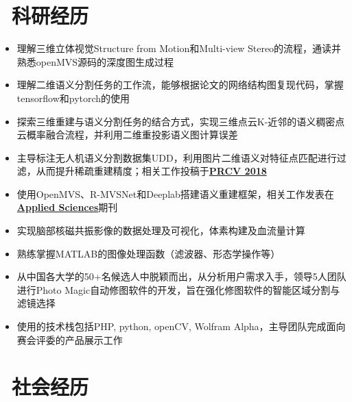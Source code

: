\documentclass{resume}
\begin{document}
\section{\faFlask\ 科研经历}

\begin{itemize}
    \item 理解三维立体视觉Structure from Motion和Multi-view Stereo的流程，通读并熟悉openMVS源码的深度图生成过程
    \item 理解二维语义分割任务的工作流，能够根据论文的网络结构图复现代码，掌握tensorflow和pytorch的使用
    \item 探索三维重建与语义分割任务的结合方式，实现三维点云K-近邻的语义稠密点云概率融合流程，并利用二维重投影语义图计算误差
	\item 主导标注无人机语义分割数据集UDD，利用图片二维语义对特征点匹配进行过滤，从而提升稀疏重建精度；相关工作投稿于\href{https://link.springer.com/content/pdf/10.1007\%2F978-3-030-03398-9_30.pdf}{\textbf{PRCV 2018}}
	\item 使用OpenMVS、R-MVSNet和Deeplab搭建语义重建框架，相关工作发表在\href{https://www.mdpi.com/2076-3417/10/4/1275/pdf}{\textbf{Applied Sciences}}期刊
\end{itemize}

\begin{itemize}[parsep=0.5ex]
  \item 实现脑部核磁共振影像的数据处理及可视化，体素构建及血流量计算
  \item 熟练掌握MATLAB的图像处理函数（滤波器、形态学操作等）
\end{itemize}


\begin{itemize}[parsep=0.5ex]
  \item 从中国各大学的50+名候选人中脱颖而出，从分析用户需求入手，领导5人团队进行Photo Magic自动修图软件的开发，旨在强化修图软件的智能区域分割与滤镜选择
  \item 使用的技术栈包括PHP, python, openCV, Wolfram Alpha，主导团队完成面向赛会评委的产品展示工作
\end{itemize}


\section{\faUsers\ 社会经历}
\end{document}
